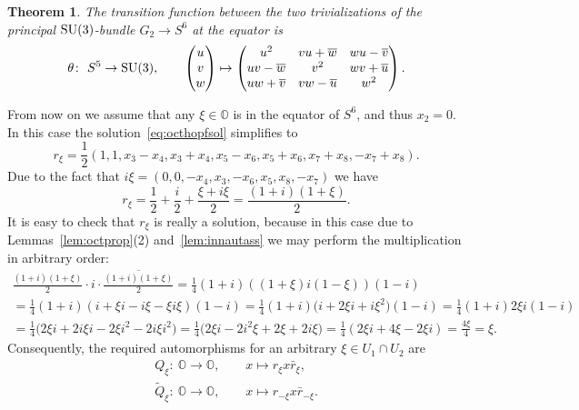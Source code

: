 \documentclass[pdftex]{sigma}
\numberwithin{equation}{section}
\newtheorem{Theorem}{Theorem}[section]
\newcommand{\SO}{\mathbb{O}} %
\begin{document}
\begin{Theorem} \label{thm:traneq} The transition function between the two trivializations of the principal ${\rm SU}(3)$-bundle $G_2 \rightarrow S^6$ at the equator is
 \begin{gather*}
 \theta\colon \ S^5 \rightarrow {\rm SU}(3), \qquad
 \begin{pmatrix}
 u\\ v\\ w
 \end{pmatrix}\mapsto
 \begin{pmatrix}
 u^2 & vu +\overline{w} &wu-\overline{v}\\
 uv-\overline{w} & v^2 & wv+\overline{u} \\
 uw+\overline{v}& vw-\overline{u} & w^2
 \end{pmatrix}.
 \end{gather*}
\end{Theorem}

From now on we assume that any $\xi \in \SO$ is in the equator of $S^6$, and thus $x_2=0$. In this case the solution~\eqref{eq:octhopfsol} simplifies to
\[
r_\xi= \frac{1}{2} (1, 1,x_3-x_4,x_3+x_4,x_5-x_6,x_5+x_6,x_7 + x_8,-x_7 + x_8 ).
\]
Due to the fact that $i\xi=(0, 0, -x_4, x_3, -x_6, x_5, x_8, -x_7)$ we have
\[r_\xi=\frac{1}{2}+\frac{i}{2}+\frac{\xi+i\xi}{2}=\frac{(1+i)(1+\xi)}{2}.\]
It is easy to check that $r_\xi$ is really a solution, because in this case due to Lemmas~\ref{lem:octprop}(2) and~\ref{lem:innautass} we may perform the multiplication in arbitrary order:
\begin{gather*}
\frac{(1+i)(1+\xi)}{2}\cdot i \cdot \overline{\frac{(1+i)(1+\xi)}{2}} =\frac{1}{4} (1+i) ((1+\xi)i(1-\xi))(1-i) \\
=\frac{1}{4} (1+i)(i+\xi i-i\xi-\xi i \xi)(1-i) = \frac{1}{4} (1+i)\big(i+2\xi i+ i \xi^2\big)(1-i)=\frac{1}{4} (1+i)2\xi i(1-i) \\
=\frac{1}{4}\big(2\xi i + 2 i\xi i -2\xi i^2 - 2 i\xi i^2\big)=\frac{1}{4}\big(2\xi i -2 i^2 \xi +2\xi +2 i \xi \big)=\frac{1}{4}(2\xi i + 4\xi -2\xi i)=\frac{4\xi}{4}=\xi.
\end{gather*}
Consequently, the required automorphisms for an arbitrary $\xi \in U_1 \cap U_2$ are
\begin{gather*} Q_\xi\colon \ \SO \rightarrow \SO,\qquad x \mapsto r_\xi x\bar{r}_\xi, \\
 \tilde{Q}_\xi\colon \ \SO \rightarrow \SO,\qquad x \mapsto r_{-\xi} x\bar{r}_{-\xi}. \end{gather*}
\end{document}
